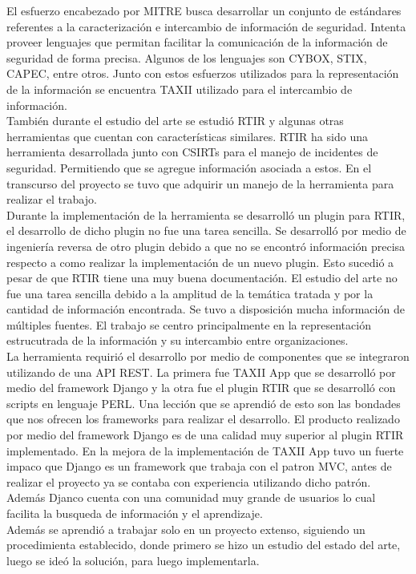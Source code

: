 \bigskip
El esfuerzo encabezado por MITRE busca desarrollar un conjunto de estándares referentes a la caracterización e intercambio de información de seguridad. Intenta proveer lenguajes que permitan facilitar la comunicación de la información de seguridad de forma precisa. Algunos de los lenguajes son CYBOX, STIX, CAPEC, entre otros. Junto con estos esfuerzos utilizados para la representación de la información se encuentra TAXII utilizado para el intercambio de información.\\
\bigskip
También durante el estudio del arte se estudió RTIR y algunas otras herramientas que cuentan con características similares. RTIR ha sido una herramienta desarrollada junto con CSIRTs para el manejo de incidentes de seguridad. Permitiendo que se agregue información asociada a estos. En el transcurso del proyecto se tuvo que adquirir un manejo de la herramienta para realizar el trabajo.\\
Durante la implementación de la herramienta se desarrolló un plugin para RTIR, el desarrollo de dicho plugin no fue una tarea sencilla. Se desarrolló por medio de ingeniería reversa de otro plugin debido a que no se encontró información precisa respecto a como realizar la implementación de un nuevo plugin. Esto sucedió a pesar de que RTIR tiene una muy buena documentación.
\bigskip
El estudio del arte no fue una tarea sencilla debido a la amplitud de la temática tratada y por la cantidad de información encontrada. Se tuvo a disposición mucha información de múltiples fuentes. El trabajo se centro principalmente en la representación estrucutrada de la información y su intercambio entre organizaciones.\\
\bigskip
La herramienta requirió el desarrollo por medio de componentes que se integraron utilizando de una API REST. La primera fue TAXII App que se desarrolló por medio del framework Django y la otra fue el plugin RTIR que se desarrolló con scripts en lenguaje PERL.
Una lección que se aprendió de esto son las bondades que nos ofrecen los frameworks para realizar el desarrollo. El producto realizado por medio del framework Django es de una calidad muy superior al plugin RTIR implementado. En la mejora de la implementación de TAXII App tuvo un fuerte impaco que Django es un framework que trabaja con el patron MVC, antes de realizar el proyecto ya se contaba con experiencia utilizando dicho patrón. Además Djanco cuenta con una comunidad muy grande de usuarios lo cual facilita la busqueda de información y el aprendizaje.\\
\bigskip
Además se aprendió a trabajar solo en un proyecto extenso, siguiendo un procedimienta establecido, donde primero se hizo un estudio del estado del arte, luego se ideó la solución, para luego implementarla.\\
